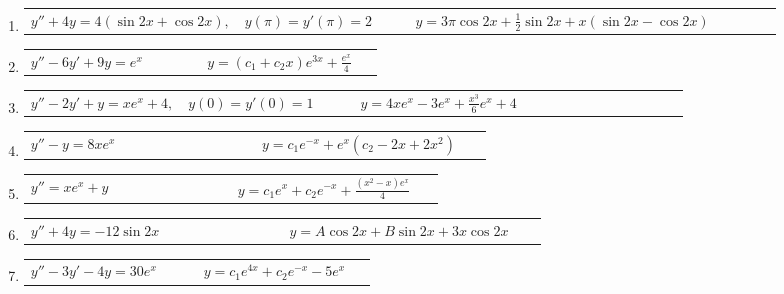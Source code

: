 \documentclass[a4paper,12pt]{article}
\begin{document}
\begin{enumerate}
    \item
    \begin{tabularx}{\linewidth}{L{0.45\linewidth} R{0.45\linewidth}}
    \( y'' + 4y = 4(\sin 2x + \cos 2x), \quad y(\pi) = y'(\pi) = 2 \) & \(\displaystyle y = 3 \pi \cos 2x + \frac{1}{2} \sin 2x + x(\sin 2x - \cos 2x) \)
    \end{tabularx}
    
    \item
    \begin{tabularx}{\linewidth}{L{0.45\linewidth} R{0.45\linewidth}}
    \( y'' - 6 y' + 9 y = e^x \) & \(\displaystyle y = (c_1 + c_2 x) e^{3x} + \frac{e^x}{4} \)
    \end{tabularx}
    
    \item
    \begin{tabularx}{\linewidth}{L{0.45\linewidth} R{0.45\linewidth}}
    \( y'' - 2 y' + y = x e^x + 4, \quad y(0) = y'(0) = 1 \) & \(\displaystyle y = 4 x e^x - 3 e^x + \frac{x^3}{6} e^x + 4 \)
    \end{tabularx}
    
    \item
    \begin{tabularx}{\linewidth}{L{0.45\linewidth} R{0.45\linewidth}}
    \( y'' - y = 8 x e^x \) & \(\displaystyle y = c_1 e^{-x} + e^x (c_2 - 2x + 2x^2) \)
    \end{tabularx}
    
    \item
    \begin{tabularx}{\linewidth}{L{0.45\linewidth} R{0.45\linewidth}}
    \( y'' = x e^x + y \) & \(\displaystyle y = c_1 e^x + c_2 e^{-x} + \frac{(x^2 - x) e^x}{4} \)
    \end{tabularx}
    
    \item
    \begin{tabularx}{\linewidth}{L{0.45\linewidth} R{0.45\linewidth}}
    \( y'' + 4y = -12 \sin 2x \) & \(\displaystyle y = A \cos 2x + B \sin 2x + 3x \cos 2x \)
    \end{tabularx}
    
    \item
    \begin{tabularx}{\linewidth}{L{0.45\linewidth} R{0.45\linewidth}}
    \( y'' - 3 y' - 4 y = 30 e^x \) & \(\displaystyle y = c_1 e^{4x} + c_2 e^{-x} - 5 e^x \)
    \end{tabularx}

\end{enumerate}
\end{document}
